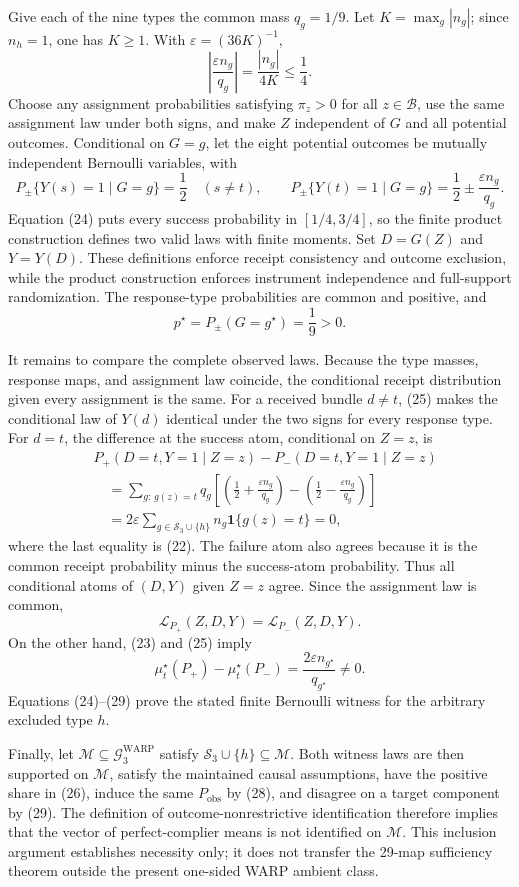 Give each of the nine types the common mass \(q_g=1/9\).  Let \(K=\max_g|n_g|\); since \(n_h=1\), one has \(K\ge1\).  With \(\varepsilon=(36K)^{-1}\),
\[
\left|\frac{\varepsilon n_g}{q_g}\right|
=\frac{|n_g|}{4K}\le\frac14. \tag{24}
\]
Choose any assignment probabilities satisfying \(\pi_z>0\) for all \(z\in\mathcal B\), use the same assignment law under both signs, and make \(Z\) independent of \(G\) and all potential outcomes.  Conditional on \(G=g\), let the eight potential outcomes be mutually independent Bernoulli variables, with
\[
P_\pm\{Y(s)=1\mid G=g\}=\frac12 \quad(s\ne t),
\qquad
P_\pm\{Y(t)=1\mid G=g\}
=\frac12\pm\frac{\varepsilon n_g}{q_g}. \tag{25}
\]
Equation (24) puts every success probability in \([1/4,3/4]\), so the finite product construction defines two valid laws with finite moments.  Set \(D=G(Z)\) and \(Y=Y(D)\).  These definitions enforce receipt consistency and outcome exclusion, while the product construction enforces instrument independence and full-support randomization.  The response-type probabilities are common and positive, and
\[
p^\star=P_\pm(G=g^\star)=\frac19>0. \tag{26}
\]

It remains to compare the complete observed laws.  Because the type masses, response maps, and assignment law coincide, the conditional receipt distribution given every assignment is the same.  For a received bundle \(d\ne t\), (25) makes the conditional law of \(Y(d)\) identical under the two signs for every response type.  For \(d=t\), the difference at the success atom, conditional on \(Z=z\), is
\[
\begin{aligned}
&P_+(D=t,Y=1\mid Z=z)-P_-(D=t,Y=1\mid Z=z)\\
&\quad=\sum_{g:\,g(z)=t}q_g
\left[
\left(\frac12+\frac{\varepsilon n_g}{q_g}\right)
-\left(\frac12-\frac{\varepsilon n_g}{q_g}\right)
\right]\\
&\quad=2\varepsilon
\sum_{g\in\mathcal S_3\cup\{h\}}n_g\mathbf 1\{g(z)=t\}=0, \tag{27}
\end{aligned}
\]
where the last equality is (22).  The failure atom also agrees because it is the common receipt probability minus the success-atom probability.  Thus all conditional atoms of \((D,Y)\) given \(Z=z\) agree.  Since the assignment law is common,
\[
\mathcal L_{P_+}(Z,D,Y)=\mathcal L_{P_-}(Z,D,Y). \tag{28}
\]
On the other hand, (23) and (25) imply
\[
\mu_t^\star(P_+)-\mu_t^\star(P_-)
=\frac{2\varepsilon n_{g^\star}}{q_{g^\star}}
\ne0. \tag{29}
\]
Equations (24)--(29) prove the stated finite Bernoulli witness for the arbitrary excluded type \(h\).

Finally, let \(\mathcal M\subseteq\mathcal G^{\mathrm{WARP}}_3\) satisfy \(\mathcal S_3\cup\{h\}\subseteq\mathcal M\).  Both witness laws are then supported on \(\mathcal M\), satisfy the maintained causal assumptions, have the positive share in (26), induce the same \(P_{\mathrm{obs}}\) by (28), and disagree on a target component by (29).  The definition of outcome-nonrestrictive identification therefore implies that the vector of perfect-complier means is not identified on \(\mathcal M\).  This inclusion argument establishes necessity only; it does not transfer the 29-map sufficiency theorem outside the present one-sided WARP ambient class.
